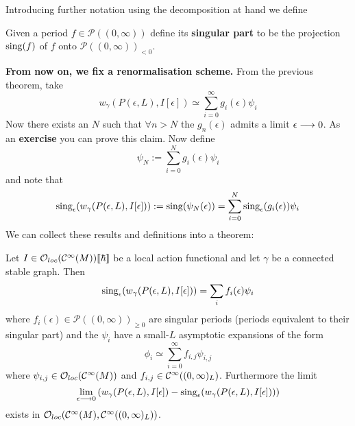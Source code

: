 Introducing further notation using the decomposition at hand we define

\begin{definition}
  Given a period $f \in \mathcal{P}((0,\infty))$ define its \textbf{singular part} to be the projection $\operatorname{sing}(f)$ of $f$ onto $\mathcal{P}((0,\infty))_{< 0}$.
\end{definition}

\textbf{From now on, we fix a renormalisation scheme.} From the previous theorem, take
$$ w_\gamma (P(\epsilon,L), I[\epsilon]) \simeq \sum_{i=0}^{\infty} g_i(\epsilon) \psi_i $$
Now there exists an $N$ such that $\forall n > N$ the $g_n(\epsilon)$ admits a limit $\epsilon \lra 0$. As an \textbf{exercise} you can prove this claim. Now define
$$ \psi_N := \sum_{i=0}^N g_i(\epsilon) \psi_i $$
and note that
$$ \sing_\epsilon (w_\gamma(P(\epsilon,L), I[\epsilon])) := \sing( \psi_N(\epsilon)) = \sum_{i=0}^N \sing_\epsilon(g_i(\epsilon)) \psi_i $$
We can collect these results and definitions into a theorem:

\begin{theo}
  Let $I \in \mathcal{O}_{loc}(\mathcal{C}^{\infty}(M)) \llbracket \hbar \rrbracket$ be a local action functional and let $\gamma$ be a connected stable graph. Then
  $$ \sing_\epsilon(w_\gamma(P(\epsilon,L), I[\epsilon])) = \sum_i f_i(\epsilon) \psi_i  $$
  where $f_i(\epsilon) \in \mathcal{P}((0,\infty))_{\geq 0}$ are singular periods (periods equivalent to their singular part) and the $\psi_i$ have a small-$L$ asymptotic expansions of the form
  $$ \phi_i \simeq \sum_{i = 0}^\infty f_{i,j} \psi_{i,j} $$
  where $\psi_{i,j} \in \mathcal{O}_{loc}(\mathcal{C}^{\infty}(M))$ and $f_{i,j} \in \mathcal{C}^{\infty}((0,\infty)_L)$. Furthermore the limit
  $$ \lim_{\epsilon \lra 0} \left( w_\gamma (P(\epsilon,L), I[\epsilon]) - \sing_\epsilon(w_\gamma (P(\epsilon,L), I[\epsilon])) \right) $$
  exists in $\mathcal{O}_{loc}(\mathcal{C}^{\infty}(M), \mathcal{C}^{\infty}((0,\infty)_L))$.
\end{theo}

